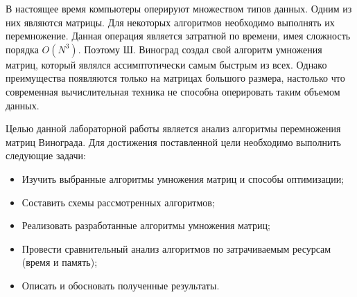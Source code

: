\setcounter{page}{4}

В настоящее время компьютеры оперируют множеством типов данных. Одним из них являются матрицы. Для некоторых алгоритмов необходимо выполнять их перемножение. Данная операция является затратной по времени, имея сложность порядка $O(N^3)$. Поэтому Ш. Виноград создал свой алгоритм умножения матриц, который являлся ассимптотически самым быстрым из всех. Однако преимущества появляются только на матрицах большого размера, настолько что современная вычислительная техника не способна оперировать таким объемом данных.

Целью данной лабораторной работы является анализ алгоритмы перемножения матриц Винограда. Для достижения поставленной цели необходимо выполнить следующие задачи:
\begin{itemize}
	\item Изучить выбранные алгоритмы умножения матриц и способы оптимизации;
	\item Составить схемы рассмотренных алгоритмов;
	\item Реализовать разработанные алгоритмы умножения матриц;
	\item Провести сравнительный анализ алгоритмов по затрачиваемым ресурсам (время и память);
	\item Описать и обосновать полученные результаты.
\end{itemize}